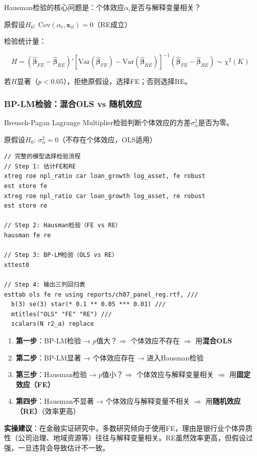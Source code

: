 Hausman检验的核心问题是：个体效应$\alpha_i$是否与解释变量相关？

原假设$H_0$: $\text{Cov}(\alpha_i, \mathbf{x}_{it}) = 0$（RE成立）

检验统计量：

\[
H = (\hat{\boldsymbol{\beta}}_{FE} - \hat{\boldsymbol{\beta}}_{RE})'[\text{Var}(\hat{\boldsymbol{\beta}}_{FE}) - \text{Var}(\hat{\boldsymbol{\beta}}_{RE})]^{-1}(\hat{\boldsymbol{\beta}}_{FE} - \hat{\boldsymbol{\beta}}_{RE}) \sim \chi^2(K)
\]

若$H$显著（$p < 0.05$），拒绝原假设，选择FE；否则选择RE。

\subsubsection{BP-LM检验：混合OLS vs 随机效应}

Breusch-Pagan Lagrange Multiplier检验判断个体效应的方差$\sigma_\alpha^2$是否为零。

原假设$H_0$: $\sigma_\alpha^2 = 0$（不存在个体效应，OLS适用）

\begin{lstlisting}[style=stata]
// 完整的模型选择检验流程
// Step 1: 估计FE和RE
xtreg roe npl_ratio car loan_growth log_asset, fe robust
est store fe
xtreg roe npl_ratio car loan_growth log_asset, re robust
est store re

// Step 2: Hausman检验（FE vs RE）
hausman fe re

// Step 3: BP-LM检验（OLS vs RE）
xttest0

// Step 4: 输出三列回归表
esttab ols fe re using reports/ch07_panel_reg.rtf, ///
  b(3) se(3) star(* 0.1 ** 0.05 *** 0.01) ///
  mtitles("OLS" "FE" "RE") ///
  scalars(N r2_a) replace
\end{lstlisting}

\begin{theorybox}[模型选择决策树]
\begin{enumerate}[leftmargin=2em]
  \item \textbf{第一步}：BP-LM检验 → $p$值大？$\Rightarrow$ 个体效应不存在 $\Rightarrow$ 用\textbf{混合OLS}
  \item \textbf{第二步}：BP-LM显著 → 个体效应存在 → 进入Hausman检验
  \item \textbf{第三步}：Hausman检验 → $p$值小？$\Rightarrow$ 个体效应与解释变量相关 $\Rightarrow$ 用\textbf{固定效应（FE）}
  \item \textbf{第四步}：Hausman不显著 → 个体效应与解释变量不相关 $\Rightarrow$ 用\textbf{随机效应（RE）}（效率更高）
\end{enumerate}

\textbf{实操建议}：在金融实证研究中，多数研究倾向于使用FE，理由是银行业个体异质性（公司治理、地域资源等）往往与解释变量相关。RE虽然效率更高，但假设过强，一旦违背会导致估计不一致。
\end{theorybox}

